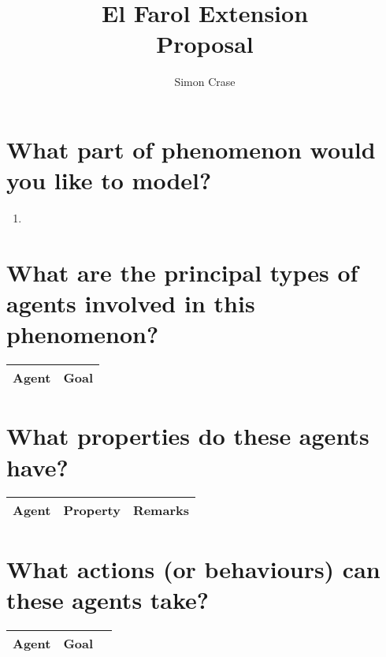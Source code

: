 \documentclass[]{article}
\title{El Farol Extension\\Proposal}
\author{Simon Crase}
\begin{document}
\maketitle

\begin{abstract}
	\cite{arthur1994inductive}
\end{abstract}


 
\section{What part of phenomenon would you like to model?}

\begin{enumerate}
	\item 
\end{enumerate}
\section{What are the principal types of agents involved in this phenomenon?}

\begin{tabular}{|l|l|} \hline
	Agent&Goal\\ \hline

\end{tabular}

\section{What properties do these agents have?}

\begin{center}
	\begin{tabular}{ |l|l|l| } 
		\hline
		Agent & Property & Remarks \\
		\hline

		\hline
	\end{tabular}
\end{center}



\section{What actions (or behaviours) can these agents take?}

\begin{tabular}{|l|l|l|} \hline
	Agent&Goal&\\ \hline

\end{tabular}
\end{document}
